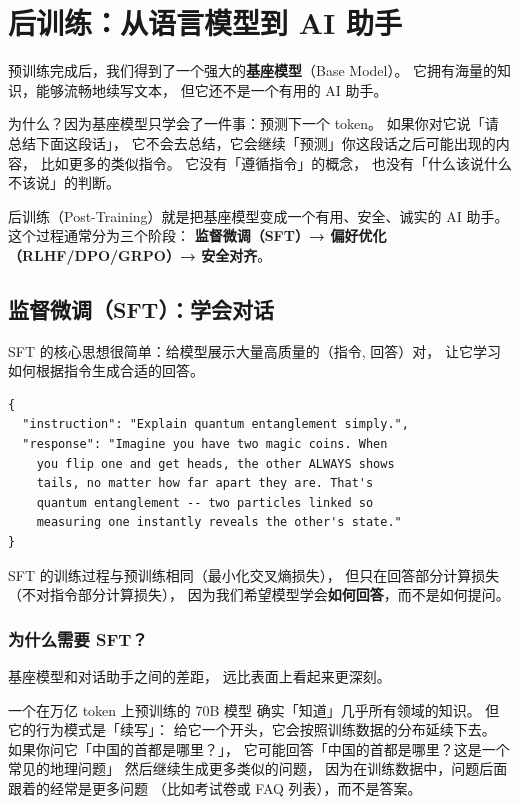 \chapter{后训练：从语言模型到 AI 助手}
\label{ch:post-training}

预训练完成后，我们得到了一个强大的\textbf{基座模型}（Base Model）。
它拥有海量的知识，能够流畅地续写文本，
但它还不是一个有用的 AI 助手。

为什么？因为基座模型只学会了一件事：预测下一个 token。
如果你对它说「请总结下面这段话」，
它不会去总结，它会继续「预测」你这段话之后可能出现的内容，
比如更多的类似指令。
它没有「遵循指令」的概念，
也没有「什么该说什么不该说」的判断。

后训练（Post-Training）就是把基座模型变成一个有用、安全、诚实的 AI 助手。
这个过程通常分为三个阶段：
\textbf{监督微调（SFT）→ 偏好优化（RLHF/DPO/GRPO）→ 安全对齐}。

\section{监督微调（SFT）：学会对话}

SFT 的核心思想很简单：给模型展示大量高质量的（指令, 回答）对，
让它学习如何根据指令生成合适的回答。

\begin{lstlisting}[caption={SFT data format example}]
{
  "instruction": "Explain quantum entanglement simply.",
  "response": "Imagine you have two magic coins. When
    you flip one and get heads, the other ALWAYS shows
    tails, no matter how far apart they are. That's
    quantum entanglement -- two particles linked so
    measuring one instantly reveals the other's state."
}
\end{lstlisting}

SFT 的训练过程与预训练相同（最小化交叉熵损失），
但只在回答部分计算损失（不对指令部分计算损失），
因为我们希望模型学会\textbf{如何回答}，而不是如何提问。

\subsection{为什么需要 SFT？}

基座模型和对话助手之间的差距，
远比表面上看起来更深刻。

一个在万亿 token 上预训练的 70B 模型
确实「知道」几乎所有领域的知识。
但它的行为模式是「续写」：
给它一个开头，它会按照训练数据的分布延续下去。
如果你问它「中国的首都是哪里？」，
它可能回答「中国的首都是哪里？这是一个常见的地理问题」
然后继续生成更多类似的问题，
因为在训练数据中，问题后面跟着的经常是更多问题
（比如考试卷或 FAQ 列表），而不是答案。

